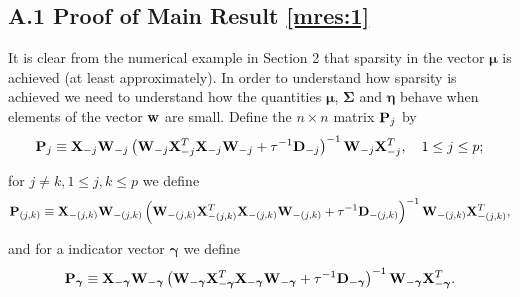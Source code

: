 \documentclass[11pt]{article}
\newtheorem{Main Result}{Main Result}
\def\vectorfontone{\bf}
\def\vectorfonttwo{\boldsymbol}
\def\vu{{\vectorfontone u}}                      %
\def\vw{{\vectorfontone w}}                      %
\def\vgamma{{\vectorfonttwo \gamma}}             %
\def\veta{{\vectorfonttwo \eta}}                 %
\def\vmu{{\vectorfonttwo \mu}}                   %
\def\matrixfontone{\bf}
\def\matrixfonttwo{\boldsymbol}
\def\mD{{\matrixfontone D}}                      %
\def\mP{{\matrixfontone P}}                      %
\def\mW{{\matrixfontone W}}                      %
\def\mX{{\matrixfontone X}}                      %
\def\mSigma{{\matrixfonttwo \Sigma}}             %
\def\ds{\displaystyle}
\begin{document}
\subsection*{A.1 Proof of Main Result \ref{mres:1}}\label{sec:proof1}

It is clear from the numerical example in Section 2 that sparsity in the vector
$\vmu$ is achieved (at least approximately). In order to understand how sparsity
is achieved we need to understand how the quantities $\vmu$, $\mSigma$ and
$\veta$ behave when elements of the vector $\vw$ are small.
Define the $n\times n$ matrix $\mP_j$ by
\begin{equation}\label{eq:Pj}
\mP_j \equiv
\mX_{-j}\mW_{-j}
\left(  \mW_{-j}\mX_{-j}^T\mX_{-j}\mW_{-j} + \tau^{-1} \mD_{-j} \right)^{-1}
\mW_{-j}\mX_{-j}^T, \quad 1\le j\le p;
\end{equation}

\noindent for $j\ne k, 1\le j,k \le p$ we define
$$
\ds \mP_{(j,k)}
\equiv \mX_{-(j,k)}\mW_{-(j,k)}
\left(
\mW_{-(j,k)}\mX_{-(j,k)}^T\mX_{-(j,k)}\mW_{-(j,k)} + \tau^{-1}\mD_{-(j,k)}
\right)^{-1} \mW_{-(j,k)}\mX_{-(j,k)}^T,
$$

\noindent and for a indicator vector $\vgamma$ we define
\begin{equation}\label{eq:Pgamma}
\ds \mP_\vgamma
\equiv \mX_{-\vgamma}\mW_{-\vgamma}
\left(
\mW_{-\vgamma}\mX_{-\vgamma}^T\mX_{-\vgamma}\mW_{-\vgamma} +\tau^{-1}\mD_{-\vgamma}
\right)^{-1} \mW_{-\vgamma}\mX_{-\vgamma}^T.
\end{equation}
\end{document}
